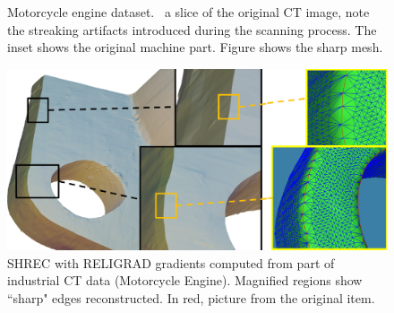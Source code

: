 \begin{figure}[t]
	\centering
	\caption{Motorcycle engine dataset.~\protect{} a slice of the original CT image, note the streaking artifacts introduced during the scanning process.
		The inset shows the original machine part. Figure \protect{} shows the sharp mesh.}
	\label{fig:setA.crop1}
\end{figure}


\begin{figure}[t]
\centering
	\includegraphics[width=\linewidth]{images/ictsetA_3.eps}
	\caption{SHREC with RELIGRAD gradients computed from part of industrial CT data (Motorcycle Engine). Magnified regions show ``sharp" edges reconstructed. In red, picture from the original item.}
	\label{fig:ict:hondaEng}
\end{figure}

